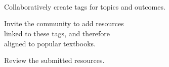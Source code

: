 \documentclass{chalkboard}
\begin{document}
\begin{frame}
\end{frame}
\begin{frame}[nofills]
\vfill

 \\

\vfill
\end{frame}
\clearbackgroundpicture

\begin{frame}
\end{frame}
\begin{frame}[nofills]
\vfill

 \\[16pt]
 \\[16pt]

\vfill
\end{frame}
\clearbackgroundpicture

\begin{frame}[nofills]
\huge
\vfill
\vfill

Collaboratively create tags for topics and outcomes.

\vfill

Invite the community to add resources \\
\quad linked to these tags, and therefore \\
\quad aligned to popular textbooks.

\vfill

Review the submitted resources.

\vfill
\vfill
\end{frame}

\begin{frame}
\end{frame}

\begin{frame}
\end{frame}

\begin{frame}
\end{frame}
\end{document}
